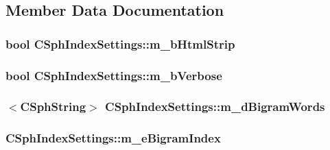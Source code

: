 \subsection{Member Data Documentation}
\hypertarget{structCSphIndexSettings_ae1dd4ac8cdbd6ad56f69a8c30b69a34c}{
\subsubsection[{m\-\_\-b\-Html\-Strip}]{\setlength{\rightskip}{0pt plus 5cm}bool C\-Sph\-Index\-Settings\-::m\-\_\-b\-Html\-Strip}}\label{structCSphIndexSettings_ae1dd4ac8cdbd6ad56f69a8c30b69a34c}
\hypertarget{structCSphIndexSettings_a70c5bbc07620bf5aeb1147a96e2d3187}{
\subsubsection[{m\-\_\-b\-Verbose}]{\setlength{\rightskip}{0pt plus 5cm}bool C\-Sph\-Index\-Settings\-::m\-\_\-b\-Verbose}}\label{structCSphIndexSettings_a70c5bbc07620bf5aeb1147a96e2d3187}
\hypertarget{structCSphIndexSettings_a95319351433dbf22a5585640a87bd0ca}{
\subsubsection[{m\-\_\-d\-Bigram\-Words}]{$<${\bf C\-Sph\-String}$>$ C\-Sph\-Index\-Settings\-::m\-\_\-d\-Bigram\-Words}}\label{structCSphIndexSettings_a95319351433dbf22a5585640a87bd0ca}
\hypertarget{structCSphIndexSettings_a7cca7fd0ef446a388f38ad1080d8ad59}{
\subsubsection[{m\-\_\-e\-Bigram\-Index}]{ C\-Sph\-Index\-Settings\-::m\-\_\-e\-Bigram\-Index}}\label{structCSphIndexSettings_a7cca7fd0ef446a388f38ad1080d8ad59}
